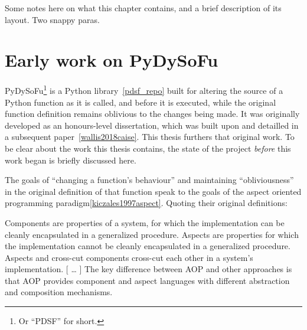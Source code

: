 







Some notes here on what this chapter contains, and a brief description of its
layout. Two snappy paras.



\section{Early work on PyDySoFu}

PyDySoFu\footnote{Or ``PDSF'' for short.} is a Python library~\cref{pdsf_repo}
built for altering the source of a Python function as it is called, and before
it is executed, while the original function definition remains oblivious to the
changes being made. It was originally developed as an honours-level
dissertation, which was built upon and detailled in a subsequent
paper~\cref{wallis2018caise}. This thesis furthers that original work. To be
clear about the work this thesis contains, the state of the project
\emph{before} this work began is briefly discussed here.

The goals of ``changing a function's behaviour'' and maintaining
``obliviousness'' in the original definition of that function speak to the goals
of the aspect oriented programming paradigm\cref{kiczales1997aspect}. Quoting
their original definitions:

\begin{displayquote}
    Components are properties of a system, for which the implementation can be
    cleanly encapsulated in a generalized procedure. Aspects are properties
    for which the implementation cannot be cleanly encapsulated in a
    generalized procedure. Aspects and cross-cut components cross-cut each other
    in a system’s implementation.
    [ \ldots{} ]
    The key difference between
    AOP and other approaches is that AOP provides component and aspect languages
    with different abstraction and composition mechanisms.
\end{displayquote}

